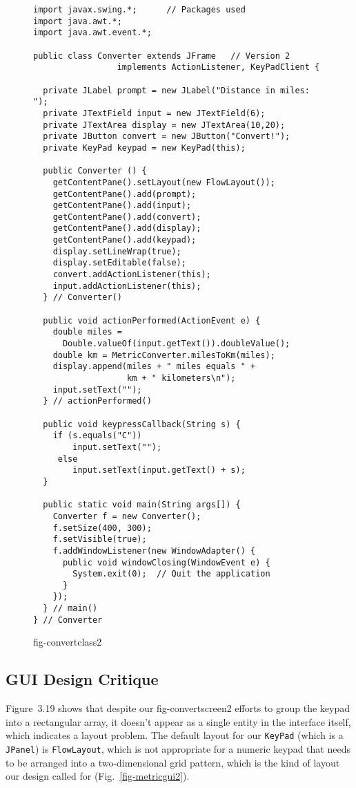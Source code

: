 \begin{figure}[p]
\jjjprogstart
\begin{jjjlisting}[27pc]
\begin{lstlisting}
import javax.swing.*;      // Packages used 
import java.awt.*;
import java.awt.event.*;

public class Converter extends JFrame   // Version 2
                 implements ActionListener, KeyPadClient { 

  private JLabel prompt = new JLabel("Distance in miles: "); 
  private JTextField input = new JTextField(6);
  private JTextArea display = new JTextArea(10,20);
  private JButton convert = new JButton("Convert!");
  private KeyPad keypad = new KeyPad(this);
  
  public Converter () {
    getContentPane().setLayout(new FlowLayout()); 
    getContentPane().add(prompt);
    getContentPane().add(input);
    getContentPane().add(convert);  
    getContentPane().add(display);
    getContentPane().add(keypad);
    display.setLineWrap(true);
    display.setEditable(false);
    convert.addActionListener(this);   
    input.addActionListener(this);
  } // Converter()
  
  public void actionPerformed(ActionEvent e) {
    double miles = 
      Double.valueOf(input.getText()).doubleValue();
    double km = MetricConverter.milesToKm(miles);
    display.append(miles + " miles equals " + 
                   km + " kilometers\n");
    input.setText("");
  } // actionPerformed()

  public void keypressCallback(String s) {
    if (s.equals("C"))
        input.setText("");
     else
        input.setText(input.getText() + s);
  }

  public static void main(String args[]) {
    Converter f = new Converter();
    f.setSize(400, 300);  
    f.setVisible(true);
    f.addWindowListener(new WindowAdapter() {  
      public void windowClosing(WindowEvent e) {
        System.exit(0);  // Quit the application
      }
    });
  } // main()
} // Converter
\end{lstlisting}
\end{jjjlisting}
{fig-convertclass2}
\end{figure}

\subsection{GUI Design Critique}
\noindent Figure~3.19 shows that despite our
{fig-convertscreen2}
efforts to group the keypad into a rectangular array, it doesn't
appear as a single entity in the interface itself, which indicates a
layout problem.  The default layout for our {\tt KeyPad} (which is a
{\tt JPanel}) is {\tt FlowLayout}, which is not appropriate for a
numeric keypad that needs to be arranged into a two-dimensional grid
pattern, which is the kind of layout our design called for
(Fig.~\ref{fig-metricgui2}).

